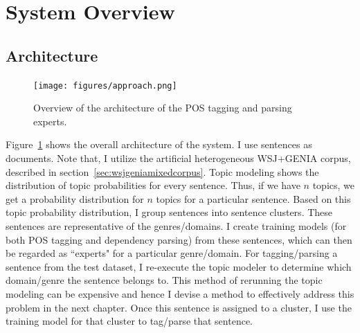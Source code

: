 \section{System Overview}\label{sec:setup}

\subsection{Architecture}

\begin{figure}[!htb]
    \centering
    \texttt{[image: figures/approach.png]}
 \caption{Overview of the architecture of the POS tagging and parsing experts.}\label{fig:architecture0}
 \end{figure}

Figure~\ref{fig:architecture0} shows the overall architecture of the system. 
I use sentences as documents. Note that, I utilize the artificial heterogeneous WSJ+GENIA corpus, described in section~\ref{sec:wsjgeniamixedcorpus}. Topic modeling shows the distribution of topic probabilities for every sentence. Thus, if we have $n$ topics, we get a probability distribution for $n$ topics for a particular sentence. Based on this topic probability distribution, I group sentences into sentence clusters. These sentences are representative of the genres/domains. I create training models (for both POS tagging and dependency parsing) from these sentences, which can then be regarded as ``experts" for a particular genre/domain. For tagging/parsing a sentence from the test dataset, I re-execute the topic modeler to determine which domain/genre the sentence belongs to. This method of rerunning the topic modeling can be expensive and hence I devise a method to effectively address this problem in the next chapter. Once this sentence is assigned to a cluster, I use the training model for that cluster to tag/parse that sentence.




